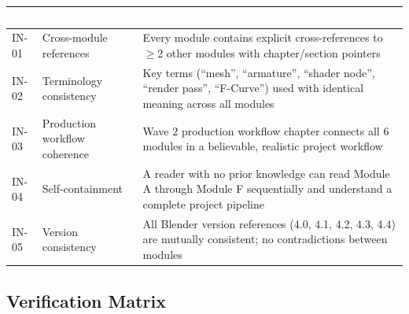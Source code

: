 \documentclass[11pt,letterpaper]{article}
\newcommand{\tableheader}[1]{\textbf{\sffamily\textcolor{white}{#1}}}
\begin{document}
\begin{center}
\begin{tabularx}{\textwidth}{L{1.5cm}L{4cm}X}
\toprule
{}
\tableheader{ID} & \tableheader{Verifies} & \tableheader{Expected} \\
\midrule
IN-01 & Cross-module references & Every module contains explicit cross-references to $\geq$2 other modules with chapter/section pointers \\
IN-02 & Terminology consistency & Key terms (``mesh'', ``armature'', ``shader node'', ``render pass'', ``F-Curve'') used with identical meaning across all modules \\
IN-03 & Production workflow coherence & Wave 2 production workflow chapter connects all 6 modules in a believable, realistic project workflow \\
IN-04 & Self-containment & A reader with no prior knowledge can read Module A through Module F sequentially and understand a complete project pipeline \\
IN-05 & Version consistency & All Blender version references (4.0, 4.1, 4.2, 4.3, 4.4) are mutually consistent; no contradictions between modules \\
\bottomrule
\end{tabularx}
\end{center}

\subsection{Verification Matrix}
\end{document}
